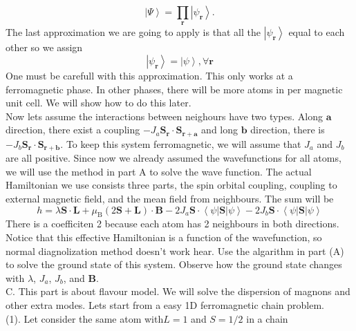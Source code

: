 \documentclass[letter]{article}
\begin{document}
$$\left|\Psi\right>=\prod_{\bm{r}} \left|\psi_{\bm{r}}\right>.
$$
The last approximation we are going to apply is that all the $ \left|\psi_{\bm{r}}\right>$ equal to each other so we assign$$
\left|\psi_{\bm{r}}\right>=\left|\psi\right>, \forall {\bm{r}}
$$ One must be carefull with this approximation. This only works at a ferromagnetic phase. In other phases, there will be more atoms in per magnetic unit cell. We will show how to do this later. \\
Now lets assume the interactions between neighours have two types. Along $\bm{a}$ direction, there exist a coupling $-J_a \bm{S_{\bm{r}}}\cdot \bm{S}_{\bm{r}+\bm{a}}$ and long $\bm{b}$ direction, there is $-J_b \bm{S_{\bm{r}}}\cdot \bm{S}_{\bm{r}+\bm{b}}$. To keep this system ferromagnetic, we will assume that $J_a$ and $J_b$ are all positive. Since now we already assumed the wavefunctions for all atoms, we will use the method in part A to solve the wave function. The actual Hamiltonian we use consists three parts, the spin orbital coupling, coupling to external magnetic field, and the mean field from neighbours. The sum will be $$
h=\lambda \bm{S}\cdot\bm{L}+\mu_{\mathrm{B}}(2\bm{S}+\bm{L})\cdot\bm{B}-2J_a\bm{S}\cdot\left<\psi\right|\bm{S}\left|\psi\right>-2J_b\bm{S}\cdot\left<\psi\right|\bm{S}\left|\psi\right>
$$ 
There is a coefficiten 2 because each atom has 2 neighbours in both directions. Notice that this effective Hamiltonian is a function of the wavefunction, so normal diagnolization method doesn't work hear. Use the algarithm in part (A) to solve the ground state of this system. Observe how the ground state changes with $\lambda$, $J_a$, $J_b$, and  $\bm{B}$.\\
C. This part is about flavour model. We will solve the dispersion of magnons and other extra modes. Lets start from a easy 1D ferromagnetic chain problem.\\
\indent (1). Let consider the same atom with$L=1$ and $S=1/2$ in a chain
\end{document}
